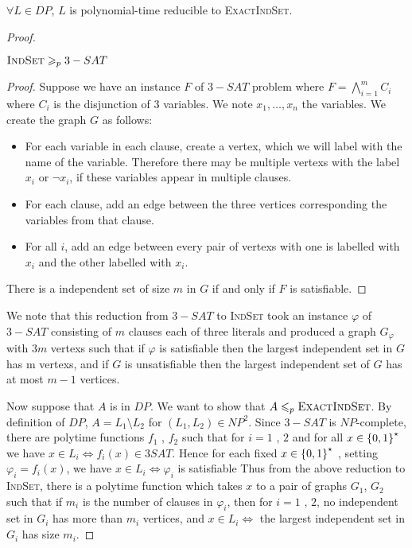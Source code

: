 \begin{propo}\label{3:2}
    $\forall L \in DP$, $L$ is polynomial-time reducible to \textsc{ExactIndSet}.
\end{propo}
\begin{proof}
    \begin{lemma}
        $\textsc{IndSet} \geqslant_p 3-SAT$
    \end{lemma}
    \begin{proof}
        Suppose we have an instance $F$ of $3-SAT$ problem where $F=\bigwedge\limits_{i=1}^m C_i$ where $C_i$ is the disjunction of 3 variables. We note $x_1,\ldots,x_n$ the variables. We create the graph $G$ as follows:
        \begin{itemize}
            \item For each variable in each clause, create a vertex, which we will label with the name of the variable. Therefore there may be multiple vertexs with the label $x_i$ or $\neg x_i$, if these variables appear in multiple clauses.
            \item For each clause, add an edge between the three vertices corresponding the variables from that clause.
            \item For all $i$, add an edge between every pair of vertexs with one is labelled with $x_i$ and the other labelled with $x_i$.
        \end{itemize}
        
        There is a independent set of size $m$ in $G$ if and only if $F$ is satisfiable.    
    \end{proof}
    
    We note that this reduction from $3-SAT$ to \textsc{IndSet} took an instance $\varphi$ of $3-SAT$ consisting of $m$ clauses each of three literals and produced a graph $G_\varphi$ with $3 m$ vertexs such that if $\varphi$ is satisfiable then the largest independent set in $G$ has m vertexs, and if $G$ is unsatisfiable then the largest independent set of $G$ has at most $m - 1$ vertices. 
    
    Now suppose that $A$ is in $DP$. We want to show that $A \leqslant_p \textsc{ExactIndSet}$. By definition of $DP$, $A = L_1 \setminus L_2$ for $(L_1,L_2) \in NP^2$. Since $3-SAT$ is $NP$-complete, there are polytime functions $f_1$ , $f_2$ such that for $i = 1$ , $2$ and for all  $x \in \left\{  0 , 1  \right\}^\star$ we have $x \in L_i \Leftrightarrow f_i ( x ) \in 3 SAT$. Hence for each fixed $x \in \left\{  0 , 1  \right\}^\star$ , setting $\varphi_i = f_i(x)$, we have  $x \in L_i \Leftrightarrow \varphi_i$ is satisfiable Thus from the above reduction to \textsc{IndSet}, there is a polytime function which takes $x$ to a pair of graphs $G_1$, $G_2$ such that if $m_i$ is the number of clauses in $\varphi_i$, then for $i = 1$ , $2$, no independent set in $G_i$ has more than $m_i$ vertices, and $x \in  L_i \Leftrightarrow$ the largest independent set in $G_i$ has size $m_i$.
    

\end{proof}
